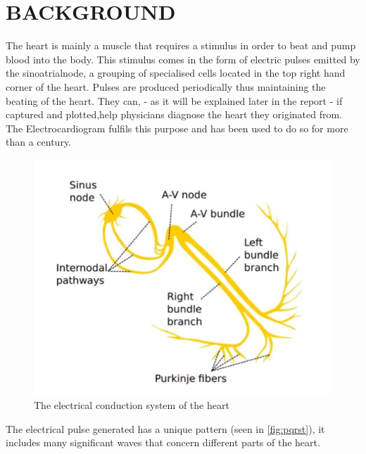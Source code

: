 

\chapter{BACKGROUND}
The heart is mainly a muscle that requires a stimulus in order to beat and pump blood into the body. This stimulus comes in the form of electric pulses emitted by the sinoatrialnode, a grouping of specialised cells located in the top right hand corner of the heart. Pulses are produced periodically thus maintaining the beating of the heart. They can, - as it will be explained later in the report - if captured and plotted,help physicians diagnose the heart they originated from. The Electrocardiogram fulfils this purpose and has been used to do so for more than a century. 
\begin{figure}[H]
    \centering
    \includegraphics[scale=0.1]{images/electrical_heart.jpg}
    \caption{The electrical conduction system of the heart}
    \label{fig:electrical_heart}
\end{figure}
The electrical pulse generated has a unique pattern (seen in \autoref{fig:pqrst}), it includes many significant waves that concern different parts of the heart\cite{Kiani2018}.

